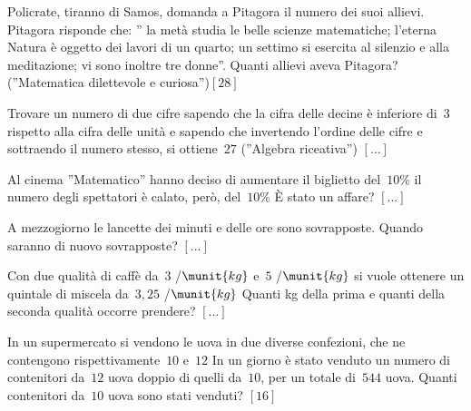 \begin{htmulticols}{2}
\begin{esercizio}[*]
\label{ese:14.44}
Policrate, tiranno di Samos, domanda a Pitagora il numero dei suoi allievi. 
Pitagora risponde che: '' la metà studia le belle scienze matematiche; l'eterna 
Natura è oggetto dei lavori di un quarto; un settimo si esercita al silenzio e 
alla meditazione; vi sono inoltre tre donne''. Quanti allievi aveva Pitagora? 
(''Matematica dilettevole e curiosa'')\hfill \(\left[28\right]\)
\end{esercizio}

\begin{esercizio}
\label{ese:14.45}
Trovare un numero di due cifre sapendo che la cifra delle decine è inferiore 
di~\(3\) rispetto alla cifra delle unità e sapendo che invertendo l'ordine 
delle 
cifre e sottraendo il numero stesso, si ottiene~\(27\) (''Algebra riceativa'')
 \hfill \(\left[...\right]\)
\end{esercizio}

\begin{esercizio}
\label{ese:14.46}
Al cinema ''Matematico'' hanno deciso di aumentare il biglietto del~\(10 \%\) 
il 
numero degli spettatori è calato, però, del~\(10 \%\) È stato un affare?
 \hfill \(\left[...\right]\)
\end{esercizio}

\begin{esercizio}
\label{ese:14.47}
A mezzogiorno le lancette dei minuti e delle ore sono sovrapposte. Quando 
saranno di nuovo sovrapposte? \hfill \(\left[...\right]\)
\end{esercizio}

\begin{esercizio}
\label{ese:14.48}
Con due qualità di caffè da~\(3\) \officialeuro/\(\munit{kg}\) e~\(5\) 
\officialeuro/\(\munit{kg}\) si vuole ottenere un quintale di miscela 
da~\(3,25\) 
\officialeuro/\(\munit{kg}\) Quanti kg della prima e quanti della seconda 
qualità 
occorre prendere? \hfill \(\left[...\right]\)
\end{esercizio}

\begin{esercizio}[*]
\label{ese:14.49}
In un supermercato si vendono le uova in due diverse confezioni, che ne 
contengono rispettivamente~\(10\) e~\(12\) In un giorno è stato venduto un 
numero 
di 
contenitori da~\(12\) uova doppio di quelli da~\(10\), per un totale di~\(544\) 
uova. 
Quanti contenitori da~\(10\) uova sono stati venduti? \hfill \(\left[16\right]\)
\end{esercizio}


\end{htmulticols}
